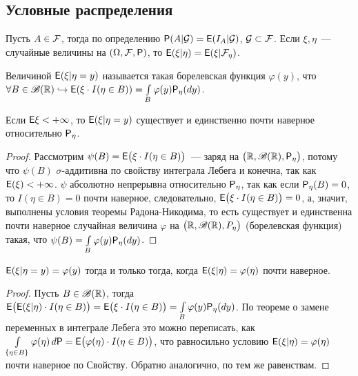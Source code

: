 \subsection{Условные распределения}
 \begin{definition}
 	Пусть $A \in \F$, тогда по определению $\P(A | \G) = \E( I_A | \G)$, $\G \subset \F$. Если $\xi, \eta$~--- случайные величины на $(\Omega, \F, \P)$, то $\E(\xi | \eta) = \E(\xi | \F_\eta)$.
 \end{definition}
 
 \begin{definition}
 	Величиной $\E (\xi | \eta = y)$ называется такая борелевская функция $\varphi(y)$, что $\forall B \in \B(\R) \hookrightarrow \E(\xi \cdot I(\eta \in B)) = \int\limits_B \varphi(y) \P_\eta (d y)$.
 \end{definition}
 
 \begin{lemma}
 	Если $\E \xi < +\infty$, то $\E( \xi | \eta = y)$ существует и единственно почти наверное относительно $\P_\eta$.
 	\begin{proof}
 		Рассмотрим $\psi(B) = \E \big( \xi \cdot I (\eta \in B) \big)$~--- заряд на $\big( \R, \B(\R), \P_\eta \big)$, потому что $\psi(B)$ $\sigma$-аддитивна по свойству интеграла Лебега и конечна, так как $\E(\xi) < +\infty$. $\psi$ абсолютно непрерывна относительно $\P_\eta$, так как если $\P_\eta(B) = 0$, то $I(\eta \in B) = 0$ почти наверное, следовательно, $\E \big( \xi \cdot I (\eta \in B) \big) = 0$, а, значит, выполнены условия теоремы Радона-Никодима, то есть существует и единственна почти наверное случайная величина $\varphi$ на $\big( \R, \B(\R), P_\eta \big)$ (борелевская функция) такая, что $\psi(B) = \int\limits_B \varphi(y) \P_\eta(dy)$.
 	\end{proof}
 \end{lemma}
 
 \begin{lemma}
 	$\E ( \xi | \eta = y) = \varphi(y)$ тогда и только тогда, когда $\E(\xi | \eta) = \varphi(\eta)$ почти наверное.
 	\begin{proof}
 		Пусть $B \in \B(\R)$, тогда $\E \big( \E(\xi | \eta) \cdot I (\eta \in B) \big) = \E \big( \xi \cdot I(\eta \in B) \big) = \int\limits_B \varphi(y) \P_\eta(d y)$. По теореме о замене переменных в интеграле Лебега это можно переписать, как $\int\limits_{\{\eta \in B \}} \varphi(\eta) \, d \P = \E \big( \varphi(\eta) \cdot I (\eta \in B) \big)$, что равносильно условию $\E(\xi | \eta) = \varphi(\eta)$ почти наверное по Свойству. Обратно аналогично, по тем же равенствам.
 	\end{proof}
 \end{lemma}
 

